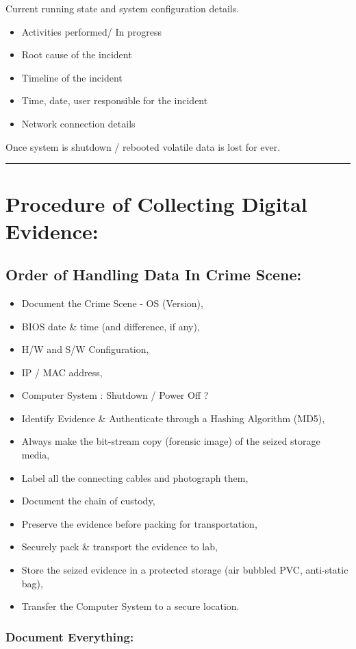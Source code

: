 \documentclass[british]{article}
\begin{document}
Current running state and system configuration details.
\begin{itemize}
\item Activities performed/ In progress
\item Root cause of the incident
\item Timeline of the incident
\item Time, date, user responsible for the incident
\item Network connection details
\end{itemize}
Once system is shutdown / rebooted volatile data is lost for ever.

\rule[0.5ex]{0.75\columnwidth}{1pt}

\section{Procedure of Collecting Digital Evidence:}

\subsection{Order of Handling Data In Crime Scene:}
\begin{itemize}
\item Document the Crime Scene - OS (Version),
\item BIOS date \& time (and difference, if any),
\item H/W and S/W Configuration,
\item IP / MAC address,
\item Computer System : Shutdown / Power Off ? 
\item Identify Evidence \& Authenticate through a Hashing Algorithm (MD5),
\item Always make the bit-stream copy (forensic image) of the seized storage
media,
\item Label all the connecting cables and photograph them,
\item Document the chain of custody,
\item Preserve the evidence before packing for transportation,
\item Securely pack \& transport the evidence to lab,
\item Store the seized evidence in a protected storage (air bubbled PVC,
anti-static bag),
\item Transfer the Computer System to a secure location.
\end{itemize}

\subsubsection{Document Everything:}
\end{document}
